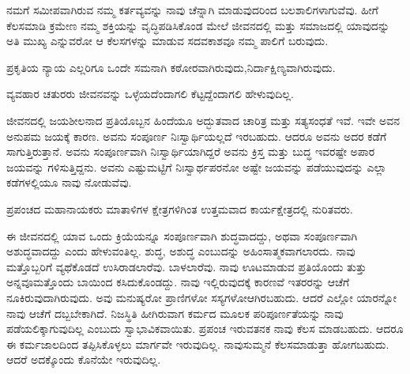ನಮಗೆ ಸಮೀಪವಾಗಿರುವ ನಮ್ಮ ಕರ್ತವ್ಯವನ್ನು ನಾವು ಚೆನ್ನಾಗಿ ಮಾಡುವುದರಿಂದ ಬಲಶಾಲಿಗಳಾಗುವೆವು. ಹೀಗೆ ಕೆಲಸಮಾಡಿ ಕ್ರಮೇಣ ನಮ್ಮ ಶಕ್ತಿಯನ್ನು ವೃದ್ಧಿಪಡಿಸಿಕೊಂಡ ಮೇಲೆ ಜೀವನದಲ್ಲಿ ಮತ್ತು ಸಮಾಜದಲ್ಲಿ ಯಾವುದನ್ನು ಅತಿ ಮುಖ್ಯ ಎನ್ನುವರೋ ಆ ಕೆಲಸಗಳನ್ನು ಮಾಡುವ ಸದವಕಾಶವೂ ನಮ್ಮ ಪಾಲಿಗೆ ಬರುವುದು.

\eject

ಪ್ರಕೃತಿಯ ನ್ಯಾಯ ಎಲ್ಲರಿಗೂ ಒಂದೇ ಸಮನಾಗಿ ಕಠೋರವಾಗಿರುವುದು,\break ನಿರ್ದಾಕ್ಷಿಣ್ಯವಾಗಿರುವುದು.

\vskip 3pt

ವ್ಯವಹಾರ ಚತುರರು ಜೀವನವನ್ನು ಒಳ್ಳೆಯದೆಂದಾಗಲಿ ಕೆಟ್ಟದ್ದೆಂದಾಗಲಿ ಹೇಳು\break ವುದಿಲ್ಲ.

\vskip 3pt

ಜೀವನದಲ್ಲಿ ಜಯಶೀಲನಾದ ಪ್ರತಿಯೊಬ್ಬನ ಹಿಂದೆಯೂ ಅದ್ಭುತವಾದ ಚಾರಿತ್ರ ಮತ್ತು ಸತ್ಯಸಂಧತೆ ಇವೆ. ಇವೇ ಅವನ ಅನುಪಮ ಜಯಕ್ಕೆ ಕಾರಣ. ಅವನು ಸಂಪೂರ್ಣ ನಿಃಸ್ವಾರ್ಥಿಯಲ್ಲದೆ ಇರಬಹುದು. ಆದರೂ ಅವನು ಅದರ ಕಡೆಗೆ ಸಾಗುತ್ತಿರುತ್ತಾನೆ. ಅವನು ಸಂಪೂರ್ಣವಾಗಿ ನಿಃಸ್ವಾರ್ಥಿಯಾಗಿದ್ದರೆ ಅವನು ಕ್ರಿಸ್ತ ಮತ್ತು ಬುದ್ಧ ಇವರಷ್ಟೇ ಅಪಾರ ಜಯವನ್ನು ಗಳಿಸುತ್ತಿದ್ದನು. ಅವನು ಎಷ್ಟುಮಟ್ಟಿಗೆ ನಿಃಸ್ವಾರ್ಥಪರನೋ ಅಷ್ಟೇ ಜಯವನ್ನು ಪಡೆಯುವುದನ್ನು ಎಲ್ಲಾ ಕಡೆಗಳಲ್ಲಿಯೂ ನಾವು ನೋಡುವೆವು.

\vskip 3pt

ಪ್ರಪಂಚದ ಮಹಾನಾಯಕರು ಮಾತಾಳಿಗಳ ಕ್ಷೇತ್ರಗಳಿಗಿಂತ ಉತ್ತಮವಾದ ಕಾರ್ಯಕ್ಷೇತ್ರದಲ್ಲಿ ನುರಿತವರು.

\vskip 3pt

ಈ ಜೀವನದಲ್ಲಿ ಯಾವ ಒಂದು ಕ್ರಿಯೆಯನ್ನೂ ಸಂಪೂರ್ಣವಾಗಿ ಶುದ್ಧವಾದದ್ದು, ಅಥವಾ ಸಂಪೂರ್ಣವಾಗಿ ಅಶುದ್ಧವಾದದ್ದು ಎಂದು ಹೇಳುವಂತಿಲ್ಲ. ಶುದ್ಧ, ಅಶುದ್ಧ ಎಂಬುದನ್ನು ಅಹಿಂಸಾತ್ಮಕವಾಗಲಾರದು. ನಾವು ಮತ್ತೊಬ್ಬರಿಗೆ ವ್ಯಥೆಕೊಡದೆ ಉಸಿರಾಡಲಾರೆವು. ಬಾಳಲಾರೆವು. ನಾವು ಊಟಮಾಡುವ ಪ್ರತಿಯೊಂದು ತುತ್ತು ಅನ್ನವೂ\break ಮತ್ತೊಂದು ಬಾಯಿಂದ ಕಸಿದುಕೊಂಡದ್ದು. ನಾವು ಇಲ್ಲಿರುವುದಕ್ಕೆ ಕಾರಣವೆ ಇತರ\-ರನ್ನು ಆಚೆಗೆ ನೂಕಿರುವುದಾಗಿರುವುದು. ಅವು ಮನುಷ್ಯರೋ ಪ್ರಾಣಿಗಳೋ ಸಸ್ಯಗಳೋ\break ಆಗಿರಬಹುದು. ಆದರೆ ಎಲ್ಲೋ ಯಾರನ್ನೋ ನಾವು ಆಚೆಗೆ ದಬ್ಬಬೇಕಾಗಿದೆ. ನಿಜಸ್ಥಿತಿ ಹೀಗಿರುವಾಗ ಕರ್ಮದ ಮೂಲಕ ಪರಿಪೂರ್ಣತೆಯನ್ನು ನಾವು ಪಡೆಯಲಿಕ್ಕಾಗುವುದಿಲ್ಲ ಎಂಬುದು ಸ್ವಾಭಾವಿಕವಾಯಿತು. ಪ್ರಪಂಚ ಇರುವತನಕ ನಾವು ಕೆಲಸ ಮಾಡಬಹುದು. ಆದರೂ ಈ ಕರ್ಮಜಾಲದಿಂದ ತಪ್ಪಿಸಿಕೊಳ್ಳಲು ಮಾರ್ಗವೇ ಇರುವುದಿಲ್ಲ. ನಾವು\break ಸುಮ್ಮನೆ ಕೆಲಸಮಾಡುತ್ತಾ ಹೋಗಬಹುದು. ಆದರೆ ಅದಕ್ಕೊಂದು ಕೊನೆಯೇ ಇರುವುದಿಲ್ಲ.

\vskip 3pt

